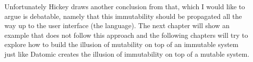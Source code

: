 Unfortunately Hickey draws another conclusion from that, which I
would like to argue is debatable, namely that this immutability
should be propagated all the way up to the user interface (the
language). The next chapter will show an example that does not
follow this approach and the following chapters will try to explore
how to build the illusion of mutability on top of an immutable
system just like Datomic creates the illusion of immutability
on top of a mutable system.

